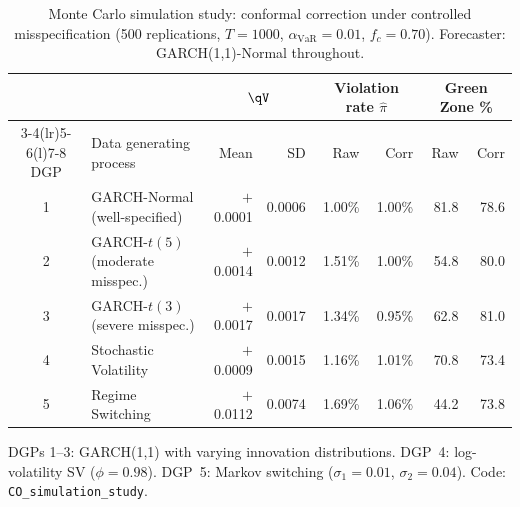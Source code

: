 \begin{table}[htbp]
\centering
\caption{Monte Carlo simulation study: conformal correction under controlled misspecification (500 replications, $T=1000$, $\alpha_{\text{VaR}}=0.01$, $f_c=0.70$). Forecaster: GARCH(1,1)-Normal throughout.}
\label{tab:simulation_study}
\scriptsize
\begin{tabular}{@{}clrrrrrr@{}}
\toprule
 & & \multicolumn{2}{c}{$\qV$} & \multicolumn{2}{c}{Violation rate $\hat{\pi}$} & \multicolumn{2}{c}{Green Zone \%} \\
\cmidrule(lr){3-4}\cmidrule(lr){5-6}\cmidrule(l){7-8}
DGP & Data generating process & Mean & SD & Raw & Corr & Raw & Corr \\
\midrule
1 & GARCH-Normal (well-specified)    & $+$0.0001 & 0.0006 & 1.00\% & 1.00\% & 81.8 & 78.6 \\
2 & GARCH-$t(5)$ (moderate misspec.) & $+$0.0014 & 0.0012 & 1.51\% & 1.00\% & 54.8 & 80.0 \\
3 & GARCH-$t(3)$ (severe misspec.)   & $+$0.0017 & 0.0017 & 1.34\% & 0.95\% & 62.8 & 81.0 \\
4 & Stochastic Volatility            & $+$0.0009 & 0.0015 & 1.16\% & 1.01\% & 70.8 & 73.4 \\
5 & Regime Switching                 & $+$0.0112 & 0.0074 & 1.69\% & 1.06\% & 44.2 & 73.8 \\
\bottomrule
\end{tabular}
\begin{minipage}{\linewidth}\scriptsize
\smallskip
DGPs 1--3: GARCH(1,1) with varying innovation distributions. DGP~4: log-volatility SV ($\phi{=}0.98$). DGP~5: Markov switching ($\sigma_1{=}0.01$, $\sigma_2{=}0.04$). Code: \texttt{CO\_simulation\_study}.
\end{minipage}
\end{table}
